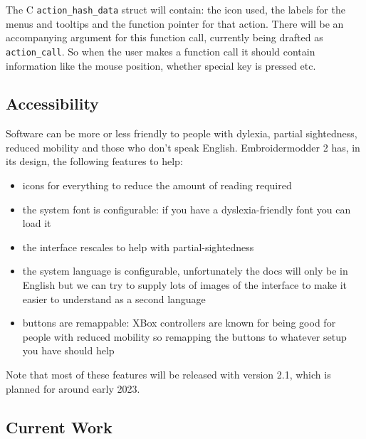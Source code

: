 \documentclass[a4paper]{report}
\begin{document}
The C \texttt{action\_hash\_data} struct will contain: the icon used, the labels for the
menus and tooltips and the function pointer for that action.
There will be an accompanying argument for this function call, currently being
drafted as \texttt{action\_call}. So when the user makes a function call it should
contain information like the mouse position, whether special key is pressed
etc.

\subsection{Accessibility}

Software can be more or less friendly to people with dylexia, partial sightedness,
reduced mobility and those who don't speak English.
Embroidermodder 2 has, in its design, the following features to help:

\begin{itemize}
\item icons for everything to reduce the amount of reading required
\item the system font is configurable: if you have a dyslexia-friendly font you can load it
\item the interface rescales to help with partial-sightedness
\item the system language is configurable, unfortunately the docs will only be in English but we can try to supply lots of images of the interface to make it easier to understand as a second language
\item buttons are remappable: XBox controllers are known for being good for people with reduced mobility so remapping the buttons to whatever setup you have should help
\end{itemize}

Note that most of these features will be released with version 2.1, which is planned for around early 2023.

\subsection{Current Work}
\end{document}
